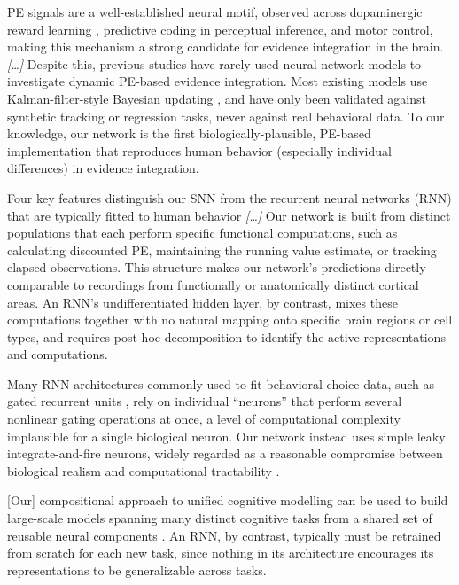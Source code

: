 \begin{ms}

PE signals are a well-established neural motif, observed across dopaminergic reward learning \citep{glimcher2011understanding}, predictive coding in perceptual inference, and motor control, making this mechanism a strong candidate for evidence integration in the brain. \textit{[\ldots]} Despite this, previous studies have rarely used neural network models to investigate dynamic PE-based evidence integration. Most existing models use Kalman-filter-style Bayesian updating \citep{millidge2021neural, adamiat2025spiking}, and have only been validated against synthetic tracking or regression tasks, never against real behavioral data. To our knowledge, our network is the first biologically-plausible, PE-based implementation that reproduces human behavior (especially individual differences) in evidence integration.

Four key features distinguish our SNN from the recurrent neural networks (RNN) that are typically fitted to human behavior \textit{[\ldots]} Our network is built from distinct populations that each perform specific functional computations, such as calculating discounted PE, maintaining the running value estimate, or tracking elapsed observations. This structure makes our network's predictions directly comparable to recordings from functionally or anatomically distinct cortical areas. An RNN's undifferentiated hidden layer, by contrast, mixes these computations together with no natural mapping onto specific brain regions or cell types, and requires post-hoc decomposition to identify the active representations and computations.

Many RNN architectures commonly used to fit behavioral choice data, such as gated recurrent units \citep{jian2025discovering}, rely on individual ``neurons'' that perform several nonlinear gating operations at once, a level of computational complexity implausible for a single biological neuron. Our network instead uses simple leaky integrate-and-fire neurons, widely regarded as a reasonable compromise between biological realism and computational tractability \citep{eliasmith2013build, gerstner2014neuronal, dayan2005theoretical}.

[Our] compositional approach to unified cognitive modelling can be used to build large-scale models spanning many distinct cognitive tasks from a shared set of reusable neural components \citep{choo2018spaun}. An RNN, by contrast, typically must be retrained from scratch for each new task, since nothing in its architecture encourages its representations to be generalizable across tasks.


\end{ms}
